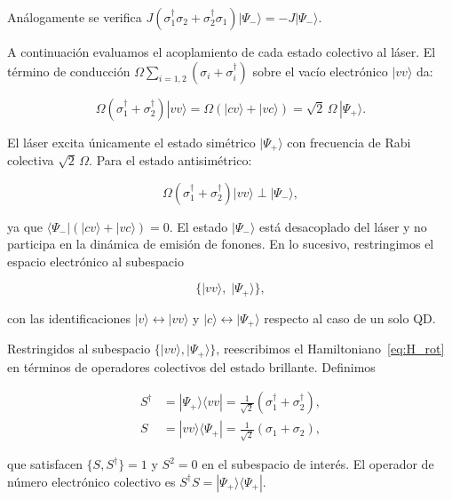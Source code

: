 \documentclass[12pt]{article}
\begin{document}
	An\'alogamente se verifica $J(\sigma_1^\dagger\sigma_2 +
	\sigma_2^\dagger\sigma_1)|\Psi_-\rangle = -J|\Psi_-\rangle$.
	
	\medskip
	\noindent
	A continuaci\'on evaluamos el acoplamiento de cada estado colectivo al l\'aser.
	El t\'ermino de conducci\'on $\Omega\sum_{i=1,2}(\sigma_i + \sigma_i^\dagger)$
	sobre el vac\'io electr\'onico $|vv\rangle$ da:
	
	\begin{equation}
		\Omega\left(\sigma_1^\dagger + \sigma_2^\dagger\right)|vv\rangle
		= \Omega\left(|cv\rangle + |vc\rangle\right)
		= \sqrt{2}\,\Omega\,|\Psi_+\rangle.
		\label{eq:laser_brillante}
	\end{equation}
	
	El l\'aser excita \'unicamente el estado sim\'etrico $|\Psi_+\rangle$ con
	frecuencia de Rabi colectiva $\sqrt{2}\,\Omega$. Para el estado
	antisim\'etrico:
	
	\begin{equation}
		\Omega\left(\sigma_1^\dagger + \sigma_2^\dagger\right)|vv\rangle
		\perp |\Psi_-\rangle,
	\end{equation}
	
	ya que $\langle\Psi_-|\left(|cv\rangle + |vc\rangle\right) = 0$. El estado
	$|\Psi_-\rangle$ est\'a desacoplado del l\'aser y no participa en la
	din\'amica de emisi\'on de fonones. En lo sucesivo, restringimos el espacio
	electr\'onico al subespacio
	
	\begin{equation}
		\{|vv\rangle,\; |\Psi_+\rangle\},
	\end{equation}
	
	con las identificaciones $|v\rangle \leftrightarrow |vv\rangle$ y
	$|c\rangle \leftrightarrow |\Psi_+\rangle$ respecto al caso de un solo QD.
	
	Restringidos al subespacio $\{|vv\rangle, |\Psi_+\rangle\}$, reescribimos el
	Hamiltoniano~\eqref{eq:H_rot} en t\'erminos de operadores colectivos del estado
	brillante. Definimos
	
	\begin{align}
		S^\dagger &= |\Psi_+\rangle\langle vv|
		= \frac{1}{\sqrt{2}}\left(\sigma_1^\dagger + \sigma_2^\dagger\right),
		\label{eq:S_dag}\\[4pt]
		S &= |vv\rangle\langle\Psi_+|
		= \frac{1}{\sqrt{2}}\left(\sigma_1 + \sigma_2\right),
		\label{eq:S}
	\end{align}
	
	que satisfacen $\{S, S^\dagger\} = 1$ y $S^2 = 0$ en el subespacio de inter\'es.
	El operador de n\'umero electr\'onico colectivo es $S^\dagger S =
	|\Psi_+\rangle\langle\Psi_+|$.
	
\end{document}
